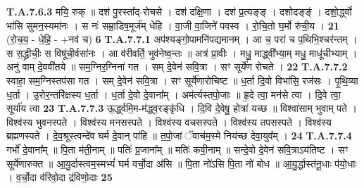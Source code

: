 \documentclass[17pt]{extarticle}
\begin{document}
                  \newline
                                                                  \textbf{ T.A.7.6.3} \newline
                  मयि॒ रुक् ॥ दश॑ पु॒रस्ता᳚द्-रोचसे । दश॑ दक्षि॒णा । दश॑ प्र॒त्यङ्ङ् । दशोदङ्ङ्॑ । दशो॒र्द्ध्वो भा॑सि सुमन॒स्यमा॑नः । स नः॑ सम्रा॒डिष॒मूर्ज॑म् धेहि । वा॒जी वा॒जिने॑ पवस्व । रो॒चि॒तो घ॒र्मो रु॑ची॒य । \textbf{ 21} \newline
                  \newline
                                                        (रो॒च॒य॒ - धे॒हि॒ - +नव॑ च) \textbf{6} \newline \newline
                                \textbf{ T.A.7.7.1} \newline
                  अप॑श्यङ्गो॒पामनि॑पद्यमानम् । आ च॒ परा॑ च प॒थिभि॒श्चर॑न्तम् । स स॒द्ध्रीचीः॒ स विषू॑ची॒र्वसा॑नः । आ व॑रीवर्ति॒ भुव॑नेष्व॒न्तः ॥ अत्र॑ प्रा॒वीः । मधु॒ माद्ध्वी᳚भ्या॒म् मधु॒ माधू॑चीभ्याम् । अनु॑ वाम् दे॒ववी॑तये ॥ सम॒ग्निर॒ग्निना॑ गत । सम् दे॒वेन॑ सवि॒त्रा । सꣳ सूर्ये॑ण रोचते । \textbf{ 22} \newline
                  \newline
                                                                  \textbf{ T.A.7.7.2} \newline
                  स्वाहा॒ सम॒ग्निस्तप॑सा गत । सम् दे॒वेन॑ सवि॒त्रा ।  सꣳ सूर्ये॑णारोचिष्ट ॥ ध॒र्ता दि॒वो विभा॑सि॒ रज॑सः । पृ॒थि॒व्या ध॒र्ता । उ॒रोर॒न्तरि॑क्षस्य ध॒र्ता । ध॒र्ता दे॒वो दे॒वाना᳚म् । अम॑र्त्यस्तपो॒जाः ॥ हृ॒दे त्वा॒ मन॑से त्वा । दि॒वे त्वा॒ सूर्या॑य त्वा \textbf{ 23} \newline
                  \newline
                                                                  \textbf{ T.A.7.7.3} \newline
                  ऊ॒र्द्ध्वमि॒म-म॑द्ध्व॒रङ्कृ॑धि । दि॒वि दे॒वेषु॒ होत्रा॑ यच्छ ॥ विश्वा॑साम् भुवाम् पते । विश्व॑स्य भुवनस्पते । विश्व॑स्य मनसस्पते । विश्व॑स्य वचसस्पते । विश्व॑स्य तपसस्पते । विश्व॑स्य ब्रह्मणस्पते । दे॒व॒श्रूस्त्वन्दे॑व घर्म दे॒वान् पा॑हि ॥ त॒पो॒जां ॅवाच॑म॒स्मे निय॑च्छ देवा॒युव᳚म् । \textbf{ 24} \newline
                  \newline
                                                                  \textbf{ T.A.7.7.4} \newline
                  गर्भो॑ दे॒वाना᳚म् ॥ पि॒ता म॑ती॒नाम् ॥  पतिः॑ प्र॒जाना᳚म् ॥ मतिः॑ कवी॒नाम् ॥  सन्दे॒वो दे॒वेन॑ सवि॒त्राऽय॑तिष्ट । सꣳ सूर्ये॑णारुक्त ॥ आ॒यु॒र्दास्त्वम॒स्मभ्यं॑ घर्म वर्चो॒दा अ॑सि ॥ पि॒ता नो॑ऽसि पि॒ता नो॑ बोध ॥ आ॒यु॒र्द्धास्त॑नू॒धाः प॑यो॒धाः ।  व॒र्चो॒दा व॑रिवो॒दा द्र॑विणो॒दाः \textbf{ 25} \newline
\end{document}
